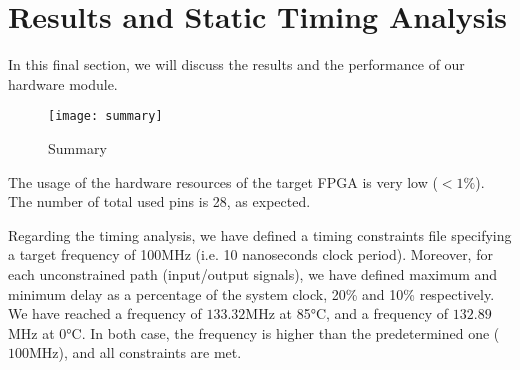 \section{Results and Static Timing Analysis}
In this final section, we will discuss the results and the performance of our hardware module.
\begin{figure}[!ht]
    \centering
    \texttt{[image: summary]}
    \caption{Summary}
    \label{fig:summary}
\end{figure}

The usage of the hardware resources of the target FPGA is very low ($< 1\%$). The number of total used pins is 28, as expected.

Regarding the timing analysis, we have defined a timing constraints file specifying a
target frequency of 100MHz (i.e. 10 nanoseconds clock period). Moreover, for each unconstrained path (input/output signals), we have defined maximum and minimum delay as a percentage of the system clock, 20\% and 10\% respectively. We have reached a frequency of $133.32$MHz at 85°C, and a frequency of $132.89$MHz at 0°C. In both case, the frequency is higher than the predetermined one ($100$MHz), and all constraints are met.